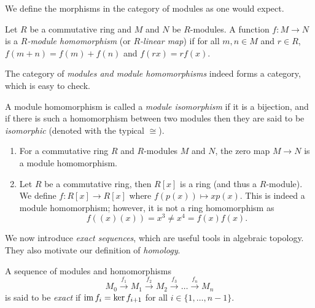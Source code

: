 We define the morphisms in the category of modules as one would expect.

\begin{definition} \label{def:module-homomorphism}
    Let $R$ be a commutative ring and $M$ and $N$ be $R$-modules. A function $f:M \to N$ is a \emph{$R$-module homomorphism} (or \emph{$R$-linear map}) if for all $m, n \in M$ and $r \in R$, $f(m + n) = f(m) + f(n)$ and $f(rx) = rf(x)$.
\end{definition}

The category of \emph{modules and module homomorphisms} indeed forms a category, which is easy to check. 

A module homomorphism is called a \emph{module isomorphism} if it is a bijection, and if there is such a homomorphism between two modules then they are said to be \emph{isomorphic} (denoted with the typical $\cong$).

\begin{example} \hspace{0em}
    \begin{enumerate}
        \item For a commutative ring $R$ and $R$-modules $M$ and $N$, the zero map $M \to N$ is a module homomorphism.
        \item Let $R$ be a commutative ring, then $R[x]$ is a ring (and thus a $R$-module). We define $f: R[x] \to R[x]$ where $f(p(x)) \mapsto xp(x)$. This is indeed a module homomorphism; however, it is not a ring homomorphism as
              \[ f((x)(x)) = x^3 \neq x^4 = f(x)f(x). \]
    \end{enumerate}
\end{example}

We now introduce \emph{exact sequences}, which are useful tools in algebraic topology. They also motivate our definition of \emph{homology}.

\begin{definition}
    A sequence of modules and homomorphisms
    \[ M_0 \xrightarrow{f_1} M_1 \xrightarrow{f_2} M_2 \xrightarrow{f_3} \ldots \xrightarrow{f_n} M_n \]
    is said to be \emph{exact} if $\operatorname{im} f_{i} = \ker f_{i+1}$ for all $i \in \{1, \ldots, n-1\}$.
\end{definition}


